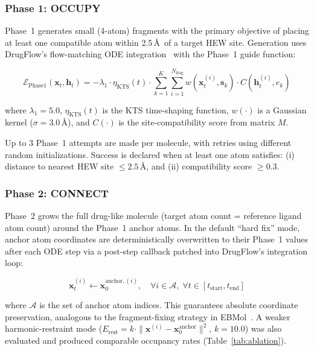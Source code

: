 \documentclass[11pt,letterpaper]{article}
\begin{document}
\subsubsection{Phase 1: OCCUPY}

Phase~1 generates small (4-atom) fragments with the primary objective of
placing at least one compatible atom within 2.5\,\AA\ of a target HEW site.
Generation uses DrugFlow's flow-matching ODE integration~\cite{drugflow2024}
with the Phase~1 guide function:

\begin{equation}\label{eq:phase1}
\mathcal{E}_{\text{Phase1}}(\mathbf{x}_t, \mathbf{h}_t) =
  -\lambda_1 \cdot \eta_{\text{KTS}}(t) \cdot
  \sum_{k=1}^{K} \sum_{i=1}^{N_{\text{frag}}}
  w(\mathbf{x}_t^{(i)}, \mathbf{s}_k) \cdot
  C(\mathbf{h}_t^{(i)}, e_k)
\end{equation}

where $\lambda_1 = 5.0$, $\eta_{\text{KTS}}(t)$ is the KTS time-shaping
function, $w(\cdot)$ is a Gaussian kernel ($\sigma = 3.0$\,\AA), and
$C(\cdot)$ is the site-compatibility score from matrix $M$.

Up to 3 Phase~1 attempts are made per molecule, with retries using different
random initializations.  Success is declared when at least one atom satisfies:
(i) distance to nearest HEW site $\le 2.5$\,\AA, and (ii) compatibility score
$\ge 0.3$.

\subsubsection{Phase 2: CONNECT}

Phase~2 grows the full drug-like molecule (target atom count = reference ligand
atom count) around the Phase~1 anchor atoms.  In the default ``hard fix'' mode,
anchor atom coordinates are deterministically overwritten to their Phase~1
values after each ODE step via a post-step callback patched into DrugFlow's
integration loop:

\begin{equation}\label{eq:hardfix}
\mathbf{x}_t^{(i)} \leftarrow \mathbf{x}_0^{\text{anchor},(i)},
\quad \forall i \in \mathcal{A},\; \forall t \in [t_{\text{start}}, t_{\text{end}}]
\end{equation}

where $\mathcal{A}$ is the set of anchor atom indices.  This guarantees
absolute coordinate preservation, analogous to the fragment-fixing strategy in
EBMol~\cite{griesbacher2026ebmol}.  A weaker harmonic-restraint mode
($E_{\text{rest}} = k \cdot \|\mathbf{x}^{(i)} -
\mathbf{x}_0^{\text{anchor}}\|^2$, $k=10.0$) was also evaluated and produced
comparable occupancy rates (Table~\ref{tab:ablation}).
\end{document}
